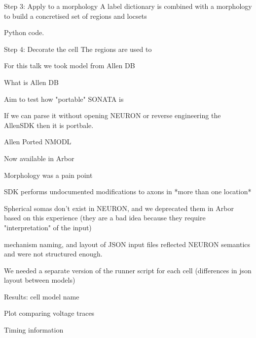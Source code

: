 \documentclass[aspectratio=43]{beamer}
\begin{document}
\begin{frame}[fragile]{Step 3: Apply to a morphology}
    A label dictionary is combined with a morphology to build a concretised set of 
    regions and locsets

    \vspace{20pt}

    Python code.
\end{frame}

\begin{frame}[fragile]{Step 4: Decorate the cell}
    The regions are used to 
\end{frame}


\begin{frame}[fragile]{}
    For this talk we took model from Allen DB

    What is Allen DB

    Aim to test how "portable" SONATA is

        If we can parse it without opening NEURON or reverse engineering the AllenSDK then it is portbale.
\end{frame}

\begin{frame}[fragile]{Allen}
    Ported NMODL

        Now available in Arbor

    Morphology was a pain point

        SDK performs undocumented modifications to axons in *more than one location*

        Spherical somas don't exist in NEURON, and we deprecated them in Arbor based on this experience
        (they are a bad idea because they require "interpretation" of the input)

mechanism naming, and layout of JSON input files reflected NEURON semantics and were not structured enough.

    We needed a separate version of the runner script for each cell (differences in json layout between models)
\end{frame}

\begin{frame}[fragile]{}
    Results: cell model name

    Plot comparing voltage traces

    Timing information
\end{frame}
\end{document}
